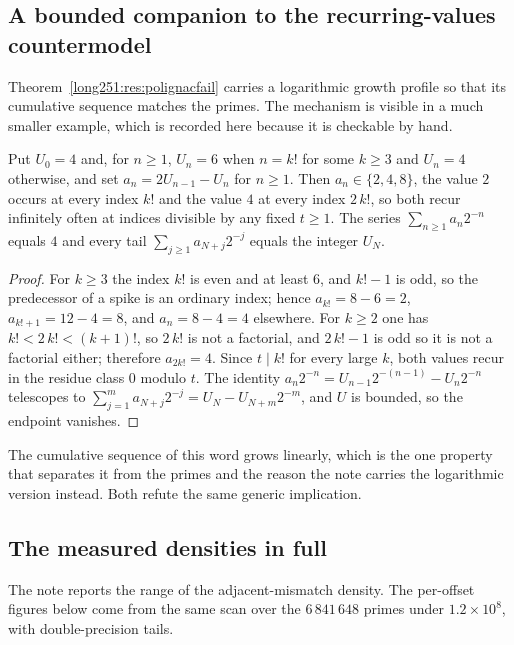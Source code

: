 \documentclass[11pt]{article}
\begin{document}
\subsection{A bounded companion to the recurring-values countermodel}
\label{long251:sec:xr-boundedpolignac}

Theorem~\ref{long251:res:polignacfail} carries a logarithmic growth profile so that its
cumulative sequence matches the primes.  The mechanism is visible in a much
smaller example, which is recorded here because it is checkable by hand.

\begin{proposition}\label{long251:xr:boundedpolignac}
Put $U_0=4$ and, for $n\ge1$, $U_n=6$ when $n=k!$ for some $k\ge3$ and $U_n=4$
otherwise, and set $a_n=2U_{n-1}-U_n$ for $n\ge1$.  Then $a_n\in\{2,4,8\}$,
the value $2$ occurs at every index $k!$ and the value $4$ at every index
$2\,k!$, so both recur infinitely often at indices divisible by any fixed
$t\ge1$.  The series $\sum_{n\ge1}a_n2^{-n}$ equals $4$ and every tail
$\sum_{j\ge1}a_{N+j}2^{-j}$ equals the integer $U_N$.
\end{proposition}

\begin{proof}
For $k\ge3$ the index $k!$ is even and at least $6$, and $k!-1$ is odd, so the
predecessor of a spike is an ordinary index; hence $a_{k!}=8-6=2$,
$a_{k!+1}=12-4=8$, and $a_n=8-4=4$ elsewhere.  For $k\ge2$ one has
$k!<2\,k!<(k+1)!$, so $2\,k!$ is not a factorial, and $2\,k!-1$ is odd so it is
not a factorial either; therefore $a_{2k!}=4$.  Since $t\mid k!$ for every
large $k$, both values recur in the residue class $0$ modulo $t$.  The identity
$a_n2^{-n}=U_{n-1}2^{-(n-1)}-U_n2^{-n}$ telescopes to
$\sum_{j=1}^{m}a_{N+j}2^{-j}=U_N-U_{N+m}2^{-m}$, and $U$ is bounded, so the
endpoint vanishes.
\end{proof}

The cumulative sequence of this word grows linearly, which is the one property
that separates it from the primes and the reason the note carries the
logarithmic version instead.  Both refute the same generic implication.

\subsection{The measured densities in full}\label{long251:sec:xr-densities}

The note reports the range of the adjacent-mismatch density.  The per-offset
figures below come from the same scan over the $6\,841\,648$ primes under
$1.2\times10^{8}$, with double-precision tails.
\end{document}

